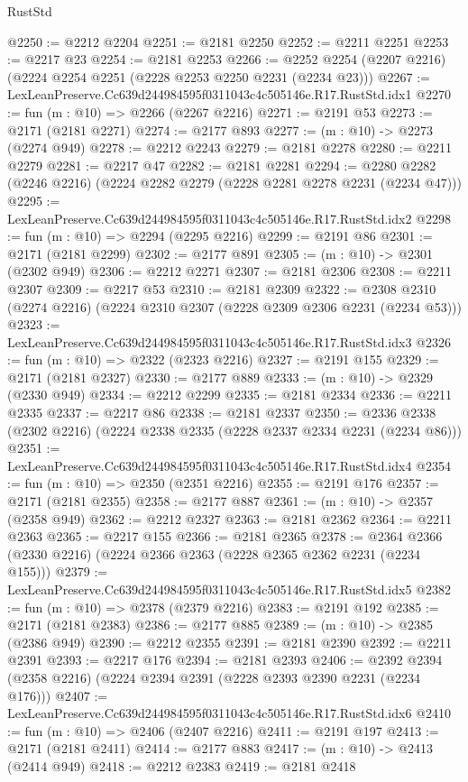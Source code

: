 \begin{lexlean}{RustStd}
\begin{coremodule}
@2250 := @2212 @2204
@2251 := @2181 @2250
@2252 := @2211 @2251
@2253 := @2217 @23
@2254 := @2181 @2253
@2266 := @2252 @2254 (@2207 @2216) (@2224 @2254 @2251 (@2228 @2253 @2250 @2231 (@2234 @23)))
@2267 := LexLeanPreserve.Cc639d244984595f0311043c4c505146e.R17.RustStd.idx1
@2270 := fun (m : @10) => @2266 (@2267 @2216)
@2271 := @2191 @53
@2273 := @2171 (@2181 @2271)
@2274 := @2177 @893
@2277 := (m : @10) -> @2273 (@2274 @949)
@2278 := @2212 @2243
@2279 := @2181 @2278
@2280 := @2211 @2279
@2281 := @2217 @47
@2282 := @2181 @2281
@2294 := @2280 @2282 (@2246 @2216) (@2224 @2282 @2279 (@2228 @2281 @2278 @2231 (@2234 @47)))
@2295 := LexLeanPreserve.Cc639d244984595f0311043c4c505146e.R17.RustStd.idx2
@2298 := fun (m : @10) => @2294 (@2295 @2216)
@2299 := @2191 @86
@2301 := @2171 (@2181 @2299)
@2302 := @2177 @891
@2305 := (m : @10) -> @2301 (@2302 @949)
@2306 := @2212 @2271
@2307 := @2181 @2306
@2308 := @2211 @2307
@2309 := @2217 @53
@2310 := @2181 @2309
@2322 := @2308 @2310 (@2274 @2216) (@2224 @2310 @2307 (@2228 @2309 @2306 @2231 (@2234 @53)))
@2323 := LexLeanPreserve.Cc639d244984595f0311043c4c505146e.R17.RustStd.idx3
@2326 := fun (m : @10) => @2322 (@2323 @2216)
@2327 := @2191 @155
@2329 := @2171 (@2181 @2327)
@2330 := @2177 @889
@2333 := (m : @10) -> @2329 (@2330 @949)
@2334 := @2212 @2299
@2335 := @2181 @2334
@2336 := @2211 @2335
@2337 := @2217 @86
@2338 := @2181 @2337
@2350 := @2336 @2338 (@2302 @2216) (@2224 @2338 @2335 (@2228 @2337 @2334 @2231 (@2234 @86)))
@2351 := LexLeanPreserve.Cc639d244984595f0311043c4c505146e.R17.RustStd.idx4
@2354 := fun (m : @10) => @2350 (@2351 @2216)
@2355 := @2191 @176
@2357 := @2171 (@2181 @2355)
@2358 := @2177 @887
@2361 := (m : @10) -> @2357 (@2358 @949)
@2362 := @2212 @2327
@2363 := @2181 @2362
@2364 := @2211 @2363
@2365 := @2217 @155
@2366 := @2181 @2365
@2378 := @2364 @2366 (@2330 @2216) (@2224 @2366 @2363 (@2228 @2365 @2362 @2231 (@2234 @155)))
@2379 := LexLeanPreserve.Cc639d244984595f0311043c4c505146e.R17.RustStd.idx5
@2382 := fun (m : @10) => @2378 (@2379 @2216)
@2383 := @2191 @192
@2385 := @2171 (@2181 @2383)
@2386 := @2177 @885
@2389 := (m : @10) -> @2385 (@2386 @949)
@2390 := @2212 @2355
@2391 := @2181 @2390
@2392 := @2211 @2391
@2393 := @2217 @176
@2394 := @2181 @2393
@2406 := @2392 @2394 (@2358 @2216) (@2224 @2394 @2391 (@2228 @2393 @2390 @2231 (@2234 @176)))
@2407 := LexLeanPreserve.Cc639d244984595f0311043c4c505146e.R17.RustStd.idx6
@2410 := fun (m : @10) => @2406 (@2407 @2216)
@2411 := @2191 @197
@2413 := @2171 (@2181 @2411)
@2414 := @2177 @883
@2417 := (m : @10) -> @2413 (@2414 @949)
@2418 := @2212 @2383
@2419 := @2181 @2418

\end{coremodule}
\end{lexlean}
